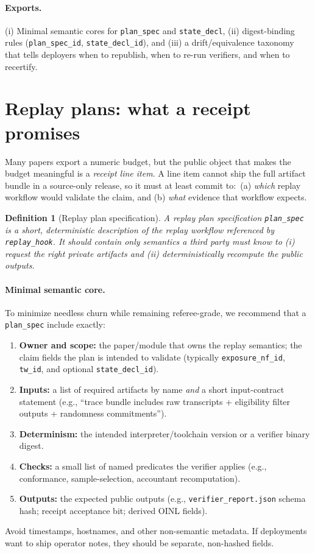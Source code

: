 \documentclass[11pt]{article}
\newtheorem{definition}{Definition}
\begin{document}
\paragraph{Exports.}
(i) Minimal semantic cores for \texttt{plan\_spec} and \texttt{state\_decl},
(ii) digest-binding rules (\texttt{plan\_spec\_id}, \texttt{state\_decl\_id}), and
(iii) a drift/equivalence taxonomy that tells deployers when to republish, when to re-run verifiers, and when to recertify.

\section{Replay plans: what a receipt promises}
Many papers export a numeric budget, but the public object that makes the budget meaningful is a \emph{receipt line item}.\cite{series:receiptitems}
A line item cannot ship the full artifact bundle in a source-only release, so it must at least commit to:\
(a) \emph{which} replay workflow would validate the claim, and
(b) \emph{what} evidence that workflow expects.

\begin{definition}[Replay plan specification]
A \emph{replay plan specification} \texttt{plan\_spec} is a short, deterministic description of the replay workflow referenced by \texttt{replay\_hook}.
It should contain only semantics a third party must know to (i) request the right private artifacts and (ii) deterministically recompute the public outputs.
\end{definition}

\paragraph{Minimal semantic core.}
To minimize needless churn while remaining referee-grade, we recommend that a \texttt{plan\_spec} include exactly:
\begin{enumerate}[leftmargin=*]
\item \textbf{Owner and scope:} the paper/module that owns the replay semantics; the claim fields the plan is intended to validate (typically \texttt{exposure\_nf\_id}, \texttt{tw\_id}, and optional \texttt{state\_decl\_id}).
\item \textbf{Inputs:} a list of required artifacts by name \emph{and} a short input-contract statement (e.g., ``trace bundle includes raw transcripts + eligibility filter outputs + randomness commitments'').
\item \textbf{Determinism:} the intended interpreter/toolchain version or a verifier binary digest.
\item \textbf{Checks:} a small list of named predicates the verifier applies (e.g., conformance, sample-selection, accountant recomputation).
\item \textbf{Outputs:} the expected public outputs (e.g., \texttt{verifier\_report.json} schema hash; receipt acceptance bit; derived OINL fields).
\end{enumerate}
Avoid timestamps, hostnames, and other non-semantic metadata.
If deployments want to ship operator notes, they should be separate, non-hashed fields.
\end{document}

